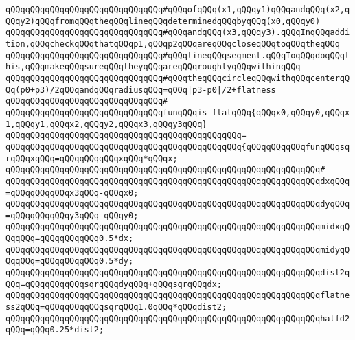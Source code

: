 \verb|qQQqqQQqqQQqqQQqqQQqqQQqqQQqqQQq#qQQqofqQQq(x1,qQQqy1)qQQqandqQQq(x2,qQQqy2)qQQqfromqQQqtheqQQqlineqQQqdeterminedqQQqbyqQQq(x0,qQQqy0)|\newline
\verb|qQQqqQQqqQQqqQQqqQQqqQQqqQQqqQQq#qQQqandqQQq(x3,qQQqy3).qQQqInqQQqaddition,qQQqcheckqQQqthatqQQqp1,qQQqp2qQQqareqQQqcloseqQQqtoqQQqtheqQQq|\newline
\verb|qQQqqQQqqQQqqQQqqQQqqQQqqQQqqQQq#qQQqlineqQQqsegment.qQQqToqQQqdoqQQqthis,qQQqmakeqQQqsureqQQqtheyqQQqareqQQqroughlyqQQqwithinqQQq|\newline
\verb|qQQqqQQqqQQqqQQqqQQqqQQqqQQqqQQq#qQQqtheqQQqcircleqQQqwithqQQqcenterqQQq(p0+p3)/2qQQqandqQQqradiusqQQq=qQQq|\verb#|p3-p0|/2+flatness#\newline
\verb|qQQqqQQqqQQqqQQqqQQqqQQqqQQqqQQq#|\newline
\verb|qQQqqQQqqQQqqQQqqQQqqQQqqQQqqQQqfunqQQqis_flatqQQq{qQQqx0,qQQqy0,qQQqx1,qQQqy1,qQQqx2,qQQqy2,qQQqx3,qQQqy3qQQq}|\newline
\verb|qQQqqQQqqQQqqQQqqQQqqQQqqQQqqQQqqQQqqQQqqQQqqQQq=|\newline
\verb|qQQqqQQqqQQqqQQqqQQqqQQqqQQqqQQqqQQqqQQqqQQqqQQq{qQQqqQQqqQQqfunqQQqsqrqQQqxqQQq=qQQqqQQqqQQqxqQQq*qQQqx;|\newline
\verb|qQQqqQQqqQQqqQQqqQQqqQQqqQQqqQQqqQQqqQQqqQQqqQQqqQQqqQQqqQQqqQQq#|\newline
\verb|qQQqqQQqqQQqqQQqqQQqqQQqqQQqqQQqqQQqqQQqqQQqqQQqqQQqqQQqqQQqqQQqdxqQQq=qQQqqQQqqQQqx3qQQq-qQQqx0;|\newline
\verb|qQQqqQQqqQQqqQQqqQQqqQQqqQQqqQQqqQQqqQQqqQQqqQQqqQQqqQQqqQQqqQQqdyqQQq=qQQqqQQqqQQqy3qQQq-qQQqy0;|\newline
\newline
\verb|qQQqqQQqqQQqqQQqqQQqqQQqqQQqqQQqqQQqqQQqqQQqqQQqqQQqqQQqqQQqqQQqmidxqQQqqQQq=qQQqqQQqqQQq0.5*dx;|\newline
\verb|qQQqqQQqqQQqqQQqqQQqqQQqqQQqqQQqqQQqqQQqqQQqqQQqqQQqqQQqqQQqqQQqmidyqQQqqQQq=qQQqqQQqqQQq0.5*dy;|\newline
\newline
\verb|qQQqqQQqqQQqqQQqqQQqqQQqqQQqqQQqqQQqqQQqqQQqqQQqqQQqqQQqqQQqqQQqdist2qQQq=qQQqqQQqqQQqsqrqQQqdyqQQq+qQQqsqrqQQqdx;|\newline
\newline
\verb|qQQqqQQqqQQqqQQqqQQqqQQqqQQqqQQqqQQqqQQqqQQqqQQqqQQqqQQqqQQqqQQqflatness2qQQq=qQQqqQQqqQQqsqrqQQq1.0qQQq*qQQqdist2;|\newline
\verb|qQQqqQQqqQQqqQQqqQQqqQQqqQQqqQQqqQQqqQQqqQQqqQQqqQQqqQQqqQQqqQQqhalfd2qQQq=qQQq0.25*dist2;|\newline
